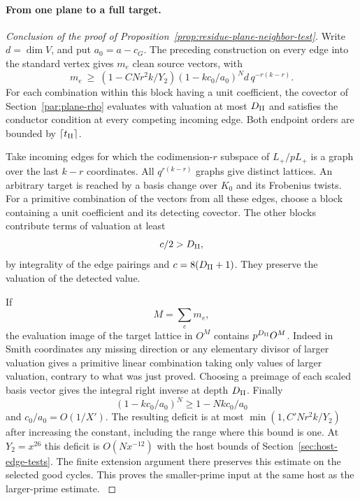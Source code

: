 \paragraph{From one plane to a full target.}
\begin{proof}[Conclusion of the proof of Proposition~\ref{prop:residue-plane-neighbor-test}]

Write \(d=\dim V\), and put \(a_0=a-c_G\).
The preceding construction on every edge into the standard
vertex gives \(m_e\) clean source vectors, with
\[
 m_e\ \ge\
 (1-CNr^2 k/Y_2)(1-k c_0/a_0)^N
                d\, q^{-r(k-r)} .
\]
For each combination within this block having a unit
coefficient, the covector of Section~\ref{par:plane-rho} evaluates
with valuation at most \(D_{\rm II}\) and satisfies the conductor
condition at every competing incoming edge. Both endpoint orders
are bounded by \(\lceil t_{\rm II}\rceil\).

Take incoming edges for which the codimension-\(r\)
subspace of \(L_+/pL_+\) is a graph over the last \(k-r\)
coordinates. All \(q^{r(k-r)}\) graphs give distinct lattices.
An arbitrary target is reached by a basis change over \(K_0\)
and its Frobenius twists. For a primitive combination of the
vectors from all these edges, choose a block containing a unit
coefficient and its detecting covector. The other blocks contribute
terms of valuation at least
\[
 c/2>D_{\rm II},
\]
by integrality
of the edge pairings and \(c=8(D_{\rm II}+1)\). They preserve
the valuation of the detected value.

If
\[
 M=\sum_e m_e,
\]
the evaluation image of the target lattice
in \(O^M\) contains \(p^{D_{\rm II}}O^M\). Indeed in Smith
coordinates any missing direction or any elementary divisor of
larger valuation gives a primitive linear combination taking
only values of larger valuation, contrary to what was just
proved. Choosing a preimage of each scaled basis vector gives
the integral right inverse at depth \(D_{\rm II}\). Finally
\[
 (1-kc_0/a_0)^N\ge 1-Nkc_0/a_0
\]
and \(c_0/a_0=O(1/X')\).
The resulting deficit is at most \(\min(1,C'Nr^2 k/Y_2)\)
after increasing the constant, including the range where this
bound is one. At \(Y_2=x^{26}\) this deficit is \(O(Nx^{-12})\)
with the host bounds of Section~\ref{sec:host-edge-tests}.
The finite extension argument there preserves this estimate
on the selected good cycles. This proves the smaller-prime input
at the same host as the larger-prime estimate.
 \label{cor:plane-lifts-1}
\end{proof}
